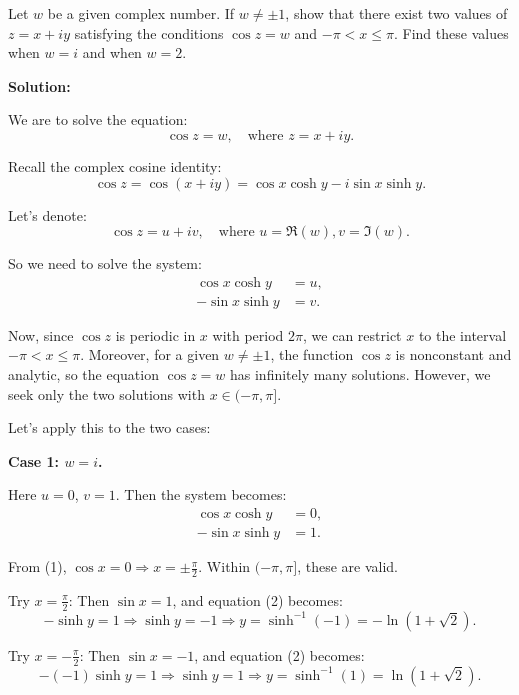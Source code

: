 \begin{problembox}
Let \( w \) be a given complex number. If \( w \ne \pm 1 \), show that there exist two values of \( z = x + iy \) satisfying the conditions \( \cos z = w \) and \( -\pi < x \leq \pi \). Find these values when \( w = i \) and when \( w = 2 \).
\end{problembox}

\textbf{Solution:}

We are to solve the equation:
\[
\cos z = w, \quad \text{where } z = x + iy.
\]

Recall the complex cosine identity:
\[
\cos z = \cos(x + iy) = \cos x \cosh y - i \sin x \sinh y.
\]

Let’s denote:
\[
\cos z = u + iv, \quad \text{where } u = \Re(w), v = \Im(w).
\]

So we need to solve the system:
\begin{align*}
\cos x \cosh y &= u, \tag{1} \\
- \sin x \sinh y &= v. \tag{2}
\end{align*}

Now, since \( \cos z \) is periodic in \( x \) with period \( 2\pi \), we can restrict \( x \) to the interval \( -\pi < x \leq \pi \). Moreover, for a given \( w \ne \pm 1 \), the function \( \cos z \) is nonconstant and analytic, so the equation \( \cos z = w \) has infinitely many solutions. However, we seek only the two solutions with \( x \in (-\pi, \pi] \).

Let’s apply this to the two cases:

\vspace{0.5em}
\textbf{Case 1: \( w = i \).}

Here \( u = 0 \), \( v = 1 \). Then the system becomes:
\begin{align*}
\cos x \cosh y &= 0, \\
- \sin x \sinh y &= 1.
\end{align*}

From (1), \( \cos x = 0 \Rightarrow x = \pm \frac{\pi}{2} \). Within \( (-\pi, \pi] \), these are valid.

Try \( x = \frac{\pi}{2} \):  
Then \( \sin x = 1 \), and equation (2) becomes:
\[
- \sinh y = 1 \Rightarrow \sinh y = -1 \Rightarrow y = \sinh^{-1}(-1) = -\ln(1 + \sqrt{2}).
\]

Try \( x = -\frac{\pi}{2} \):  
Then \( \sin x = -1 \), and equation (2) becomes:
\[
-(-1) \sinh y = 1 \Rightarrow \sinh y = 1 \Rightarrow y = \sinh^{-1}(1) = \ln(1 + \sqrt{2}).
\]

